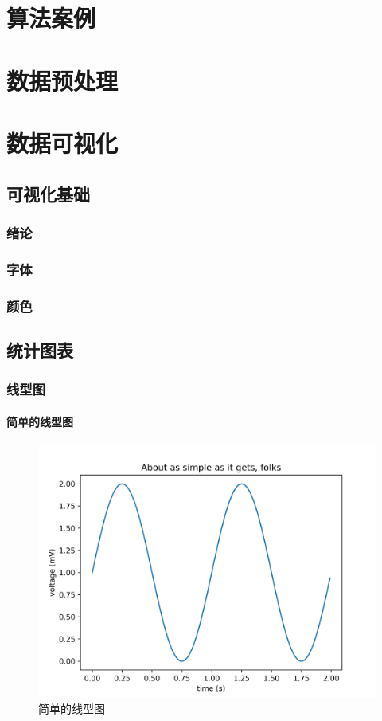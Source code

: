 \documentclass[openany]{progbookcn}
\begin{document}
\part{算法案例}

\part{数据预处理}
\part{数据可视化}
\chapter{可视化基础}
\section{绪论}
\section{字体}
\section{颜色}
\chapter{统计图表}
\section{线型图}
\subsection{简单的线型图}

\begin{figure}[H]
\centering
\includegraphics[width=0.6 \textwidth]{figs/chapter9/lines/SimpleLine}
\caption{简单的线型图}
\end{figure}
\end{document}
